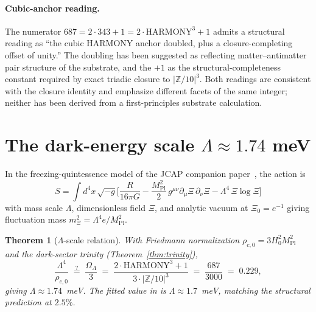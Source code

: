\documentclass[11pt,reqno]{amsart}
\theoremstyle{plain}
\newtheorem{theorem}{Theorem}[section]
\theoremstyle{definition}
\theoremstyle{remark}
\newcommand{\Z}{\mathbb{Z}}
\begin{document}
\paragraph{Cubic-anchor reading.}
The numerator $687 = 2 \cdot 343 + 1 = 2 \cdot \mathrm{HARMONY}^{3} + 1$
admits a structural reading as ``the cubic $\mathrm{HARMONY}$
anchor doubled, plus a closure-completing offset of unity.''
The doubling has been suggested as reflecting matter--antimatter
pair structure of the substrate, and the $+1$ as the
structural-completeness constant required by exact triadic
closure to $|\Z/10|^{3}$. Both readings are consistent with the
closure identity and emphasize different facets of the same
integer; neither has been derived from a first-principles
substrate calculation.

\section{The dark-energy scale $\Lambda \approx 1.74$ meV}\label{sec:lambda}

In the freezing-quintessence model of the JCAP companion
paper~\cite{SandersGish2026JCAP}, the action is
\[
  S = \int d^{4}x\,\sqrt{-g}\Big[\frac{R}{16\pi G}
     - \frac{M_\mathrm{Pl}^{2}}{2}\,g^{\mu\nu}\partial_\mu\Xi\,\partial_\nu\Xi
     - \Lambda^{4}\,\Xi\log\Xi\Big]
\]
with mass scale $\Lambda$, dimensionless field $\Xi$, and analytic
vacuum at $\Xi_0 = e^{-1}$ giving fluctuation mass
$m_\Xi^{2} = \Lambda^{4} e / M_\mathrm{Pl}^{2}$.

\begin{theorem}[$\Lambda$-scale relation]\label{thm:lambda-scale}
With Friedmann normalization $\rho_{c,0} = 3 H_{0}^{2} M_\mathrm{Pl}^{2}$
and the dark-sector trinity (Theorem~\ref{thm:trinity}),
\[
  \frac{\Lambda^{4}}{\rho_{c,0}}
  \;\stackrel{?}{=}\;
  \frac{\Omega_\Lambda}{3}
  \;=\;
  \frac{2\cdot\mathrm{HARMONY}^{3} + 1}{3 \cdot |\Z/10|^{3}}
  \;=\; \frac{687}{3000}
  \;=\; 0.229,
\]
giving $\Lambda \approx 1.74$~meV. The fitted value in
\cite{SandersGish2026JCAP} is $\Lambda \approx 1.7$~meV,
matching the structural prediction at $2.5\%$.
\end{theorem}

\end{document}
